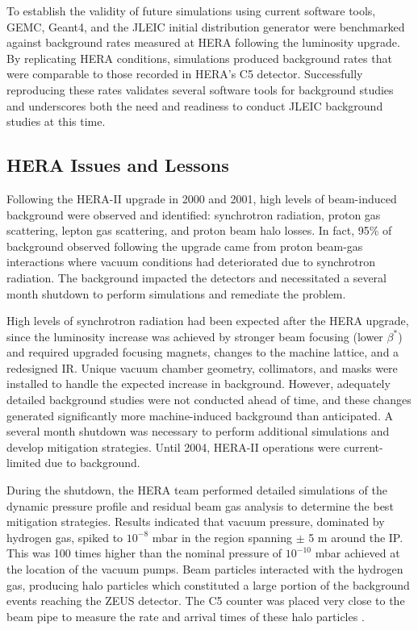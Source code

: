 To establish the validity of future simulations using current software tools, GEMC, Geant4, and the JLEIC initial distribution generator were benchmarked against background rates measured at HERA following the luminosity upgrade.  By replicating HERA conditions, simulations produced background rates that were comparable to those recorded in HERA's C5 detector.  Successfully reproducing these rates validates several software tools for background studies and underscores both the need and readiness to conduct JLEIC background studies at this time.

\subsection{HERA Issues and Lessons}

Following the HERA-II upgrade in 2000 and 2001, high levels of beam-induced background were observed and identified: synchrotron radiation, proton gas scattering, lepton gas scattering, and proton beam halo losses.   In fact, 95\% of background observed following the upgrade came from proton beam-gas interactions where vacuum conditions had deteriorated due to synchrotron radiation.  The background impacted the detectors and necessitated a several month shutdown to perform simulations and remediate the problem.

High levels of synchrotron radiation had been expected after the HERA upgrade, since the luminosity increase was achieved by stronger beam focusing (lower $\beta^*$) and required upgraded focusing magnets, changes to the machine lattice, and a redesigned IR. Unique vacuum chamber geometry, collimators, and masks were installed to handle the expected increase in background.  However, adequately detailed background studies were not conducted ahead of time, and these changes generated significantly more machine-induced background than anticipated.  A several month shutdown was necessary to perform additional simulations and develop mitigation strategies.  Until 2004, HERA-II operations were current-limited due to background.

During the shutdown, the HERA team performed detailed simulations of the dynamic pressure profile and residual beam gas analysis to determine the best mitigation strategies.  Results indicated that vacuum pressure, dominated by hydrogen gas, spiked to $10^{-8}$ mbar in the region spanning $\pm$ 5 m around the IP.   This  was 100 times higher than the nominal pressure of $10^{-10}$ mbar achieved at the location of the vacuum pumps.  Beam particles interacted with the hydrogen gas, producing halo particles which constituted a large portion of the background events reaching the ZEUS detector.  The C5 counter was placed very close to the beam pipe to measure the rate and arrival times of these halo particles \cite{Furletova:2015pma}.

